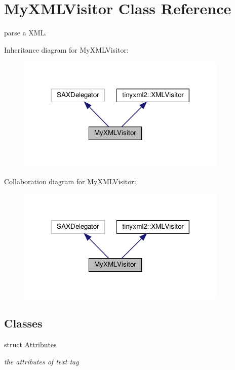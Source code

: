 \hypertarget{classMyXMLVisitor}{}\section{My\+X\+M\+L\+Visitor Class Reference}
\label{classMyXMLVisitor}


parse a X\+ML.  




Inheritance diagram for My\+X\+M\+L\+Visitor\+:
\nopagebreak
\begin{figure}[H]
\begin{center}
\leavevmode
\includegraphics[width=284pt]{classMyXMLVisitor__inherit__graph}
\end{center}
\end{figure}


Collaboration diagram for My\+X\+M\+L\+Visitor\+:
\nopagebreak
\begin{figure}[H]
\begin{center}
\leavevmode
\includegraphics[width=284pt]{classMyXMLVisitor__coll__graph}
\end{center}
\end{figure}
\subsection*{Classes}
\begin{DoxyCompactItemize}
\item 
struct \hyperlink{structMyXMLVisitor_1_1Attributes}{Attributes}
\begin{DoxyCompactList}\small\item\em the attributes of text tag \end{DoxyCompactList}\end{DoxyCompactItemize}
